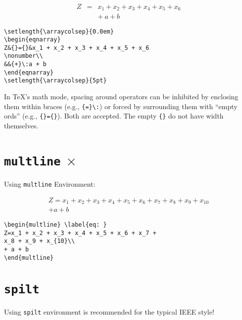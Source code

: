 \documentclass[journal]{IEEEtran}
\begin{document}
\setlength{\arraycolsep}{0.0em}
\begin{eqnarray}
Z&{}={}&x_1 + x_2 + x_3 + x_4 + x_5 + x_6\nonumber\\
&&{+}\:a + b
\end{eqnarray}
\setlength{\arraycolsep}{5pt}

\begin{verbatim}
\setlength{\arraycolsep}{0.0em}
\begin{eqnarray}
Z&{}={}&x_1 + x_2 + x_3 + x_4 + x_5 + x_6
\nonumber\\
&&{+}\:a + b
\end{eqnarray}
\setlength{\arraycolsep}{5pt}
\end{verbatim}

In \TeX’s math mode, spacing around operators can be inhibited by enclosing them within
braces (e.g., \verb!{=}\:!) or forced by surrounding them with “empty ords” (e.g., \verb!{}={}!).
Both are accepted. The empty  \verb!{}! do not have width themselves.

\noindent \dotfill
\section{\texttt{multline} {\color{red} \Large $\mathbf{\times}$}}
Using \verb!multline! Environment:

\begin{multline}
Z=x_1 + x_2 + x_3 + x_4 + x_5 + x_6 + x_7 + x_8 + x_9 + x_{10}\\
+ a + b
\end{multline}

\begin{verbatim}
\begin{multline} \label{eq: }
Z=x_1 + x_2 + x_3 + x_4 + x_5 + x_6 + x_7 +
x_8 + x_9 + x_{10}\\
+ a + b
\end{multline}
\end{verbatim}


\noindent \dotfill
\section{\texttt{spilt}}
Using \verb!spilt! environment is recommended for the typical IEEE style!
\end{document}
